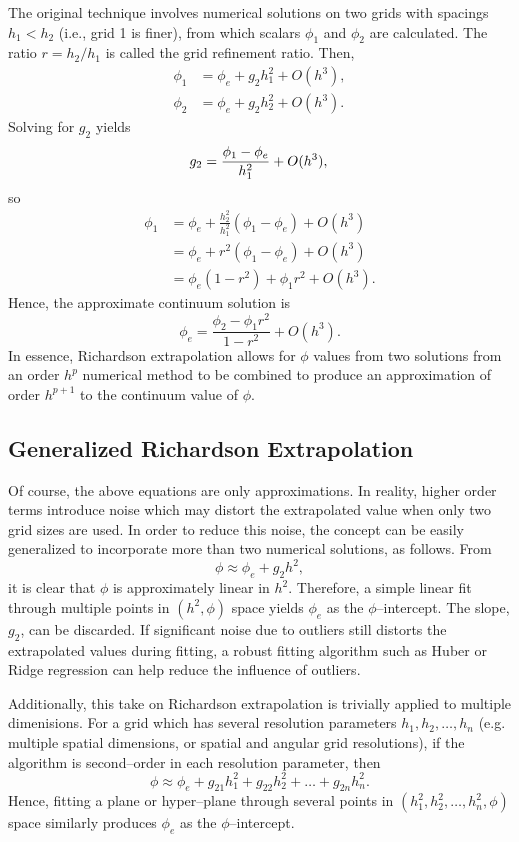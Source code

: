 The original technique involves numerical solutions on two grids with spacings $h_1 < h_2$ (i.e., grid 1 is finer), from which scalars $\phi_1$ and $\phi_2$ are calculated.
The ratio $r = h_2/h_1$ is called the grid refinement ratio.
Then,
\begin{align*}
  \phi_1 &= \phi_e + g_2 h_1^2 + O(h^3), \\
  \phi_2 &= \phi_e + g_2 h_2^2 + O(h^3).
\end{align*}
Solving for $g_2$ yields
\begin{equation*}
  g_2 = \frac{\phi_1 - \phi_e}{h_1^2} + O(h^3), \\
\end{equation*}
so
\begin{align*}
  \phi_1 &= \phi_e + \frac{h_2^2}{h_1^2}(\phi_1 - \phi_e) + O(h^3) \\
  &=  \phi_e + r^2(\phi_1 - \phi_e) + O(h^3) \\
  &= \phi_e(1-r^2) + \phi_1 r^2 + O(h^3).
\end{align*}
Hence, the approximate continuum solution is
\begin{equation*}
  \phi_e = \frac{\phi_2 - \phi_1 r^2}{1 - r^2} + O(h^3).
\end{equation*}
In essence, Richardson extrapolation allows for $\phi$ values from two solutions from an order $h^p$ numerical method to be combined to produce an approximation of order $h^{p+1}$ to the continuum value of $\phi$.

\subsection{Generalized Richardson Extrapolation}
\label{sec:generalized_re}
Of course, the above equations are only approximations.
In reality, higher order terms introduce noise which may distort the extrapolated value
when only two grid sizes are used.
In order to reduce this noise, the concept can be easily generalized to incorporate more than two numerical solutions, as follows.
From
\begin{equation*}
  \phi \approx \phi_e + g_2 h^2,
\end{equation*}
it is clear that $\phi$ is approximately linear in $h^2$.
Therefore, a simple linear fit through multiple points in $(h^2, \phi)$ space yields $\phi_e$ as the $\phi$--intercept.
The slope, $g_2$, can be discarded.
If significant noise due to outliers still distorts the extrapolated values during fitting, a robust fitting algorithm such as Huber \cite{yu_robust_2014} or Ridge \cite{hoerl_ridge_1970} regression can help reduce the influence of outliers.

Additionally, this take on Richardson extrapolation is trivially applied to multiple dimenisions.
For a grid which has several resolution parameters $h_1, h_2, \ldots, h_n$ (e.g. multiple spatial dimensions, or spatial and angular grid resolutions), if the algorithm is second--order in each resolution parameter, then
\begin{equation*}
  \phi \approx \phi_e + g_{21} h_1^2 + g_{22} h_2^2 + \ldots + g_{2n} h_n^2.
\end{equation*}
Hence, fitting a plane or hyper--plane through several points in $(h_1^2, h_2^2, \ldots, h_n^2, \phi)$ space similarly produces $\phi_e$ as the $\phi$--intercept.

